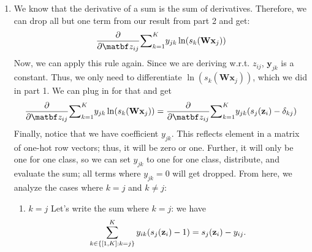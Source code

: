 \documentclass[submit]{harvardml}
\newenvironment{ans}{
  \begin{enumerate}
  \color{blue}
}{
  \end{enumerate}
  \color{black}
}
\begin{document}
\begin{ans}
$$    $$
    By the Multiplication Rule. Now we take the log. To do this, we must first find the log of the sigmoid. In general, we can apply rules of logs:
    $$
    -\ln s_k(\mathbf z) = \ln(e^{\mathbf z_k}) - \ln(\sum_{j = 1}^K e^{\mathbf z_j}) =  \sum_{j = 1}^K \mathbf z_j - \mathbf z_k
    $$
    Now, applying our negative log from above, we get
    $$
    \sum_{j = 1}^n\mathbf \left(\mathbf \sum_{k = 1}^K  y_{jk} \ln(s_k(\mathbf{Wx}_j))\right)
    $$
    \item We know that the derivative of a sum is the sum of derivatives. Therefore, we can drop all but one term from our result from part 2 and get:
    $$
    \frac{\partial}{\partial \matbf z_{ij}}\mathbf \sum_{k = 1}^K y_{jk}\ln(s_k(\mathbf{Wx}_j))
    $$
    Now, we can apply this rule again. Since we are deriving w.r.t. $z_{ij}$, $\mathbf y_{jk}$ is a constant. Thus, we only need to differentiate $\ln(s_k(\mathbf{Wx}_j))$, which we did in part 1. We can plug in for that and get 
    $$
    \frac{\partial}{\partial \matbf z_{ij}}\mathbf \sum_{k = 1}^K y_{jk}\ln(s_k(\mathbf{Wx}_j)) = \frac{\partial}{\partial \matbf z_{ij}}\mathbf \sum_{k = 1}^K y_{jk}(s_{j}(\mathbf z_i) - \delta_{kj})
    $$
    Finally, notice that we have coefficient $y_{jk}$. This reflects element in a matrix of one-hot row vectors; thus, it will be zero or one. Further, it will only be one for one class, so we can set $y_{jk}$ to one for one class, distribute, and evaluate the sum; all terms where $y_{jk} = 0$ will get dropped. From here, we analyze the cases where $k = j$ and $k \neq j$:
    \begin{enumerate}
        \item $k = j$ Let's write the sum where $k = j$: we have 
        $$
        \sum_{k \in \{[1, K] : k = j\}}^K y_{ik}(s_j(\mathbf{z}_i) - 1) = s_j(\mathbf{z}_i) - y_{ij}.
$$
\end{enumerate}
\end{ans}
\end{document}
